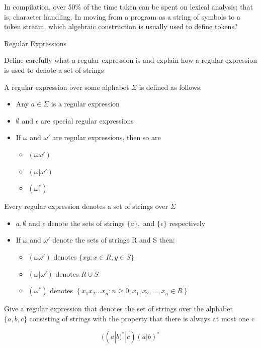 \documentclass{exam}
\begin{document}
\begin{questions}
\question[2]In compilation, over 50\% of the time taken can be spent on lexical analysis; that is, character handling. In moving from a program as a string of symbols to a token stream, which algebraic construction is usually used to define tokens?
\begin{solution}[2in]
	Regular Expressions
\end{solution}

\question[14]Define carefully what a regular expression is and explain how a regular expression is used to denote a set of strings
\begin{solution}[2in]
	A regular expression over some alphabet $\Sigma$ is defined as follows:
	\begin{itemize}
		\item Any $a\in \Sigma$ is a regular expression
		\item $\emptyset$ and $\epsilon$ are special regular expressions
		\item If $\omega$ and $\omega'$ are regular expressions, then so are
		\begin{itemize}
			\item $(\omega\omega')$
			\item $(\omega|\omega')$
			\item $(\omega^*)$
		\end{itemize}
	\end{itemize}
	Every regular expression denotes a set of strings over $\Sigma$
	\begin{itemize}
		\item $a,\emptyset$ and $\epsilon$ denote the sets of strings $\{a\},{}$ and $\{\epsilon\}$ respectively
		\item If $\omega$ and $\omega'$ denote the sets of strings R and S then:
		\begin{itemize}
			\item $(\omega\omega')$ denotes \(\{x y : x \in R, y \in S\}\)
			\item $(\omega|\omega')$ denotes $R\cup S$
			\item $(\omega^*)$ denotes \(\left\{x_{1} x_{2} \ldots x_{n} : n \geq 0, x_{1}, x_{2}, \ldots, x_{n} \in R\right\}\)
		\end{itemize}
	\end{itemize}
\end{solution}

\question[5]Give a regular expression that denotes the set of strings over the alphabet $\{a,b,c\}$ consisting of strings with the property that there is always at most one c
\begin{solution}[2in]
	$$((a|b)^*|c)(a|b)^*$$
\end{solution}


\end{questions}
\end{document}
